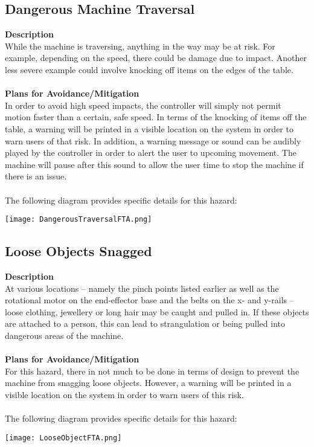 \documentclass[titlepage]{article}
\begin{document}
\newpage
\subsection{Dangerous Machine Traversal}
\textbf{Description}\\
While the machine is traversing, anything in the way may be at risk. For example, depending on the speed, there could be damage due to impact. Another less severe example could involve knocking off items on the edges of the table.\\~\\
\textbf{Plans for Avoidance/Mitigation}\\
In order to avoid high speed impacts, the controller will simply not permit motion faster than a certain, safe speed. In terms of the knocking of items off the table, a warning will be printed in a visible location on the system in order to warn users of that risk. In addition, a warning message or sound can be audibly played by the controller in order to alert the user to upcoming movement. The machine will pause after this sound to allow the user time to stop the machine if there is an issue.\\~\\
The following diagram provides specific details for this hazard:
\begin{center}
	\texttt{[image: DangerousTraversalFTA.png]}
\label{fig:yRailFig}
\end{center}

\newpage
\subsection{Loose Objects Snagged}
\textbf{Description}\\
At various locations -- namely the pinch points listed earlier as well as the rotational motor on the end-effector base and the belts on the x- and y-rails -- loose clothing, jewellery or long hair may be caught and pulled in. If these objects are attached to a person, this can lead to strangulation or being pulled into dangerous areas of the machine.\\~\\
\textbf{Plans for Avoidance/Mitigation}\\
For this hazard, there in not much to be done in terms of design to prevent the machine from snagging loose objects. However, a warning will be printed in a visible location on the system in order to warn users of this risk.\\~\\
The following diagram provides specific details for this hazard:
\begin{center}
	\texttt{[image: LooseObjectFTA.png]}
\label{fig:yRailFig}
\end{center}
\end{document}
